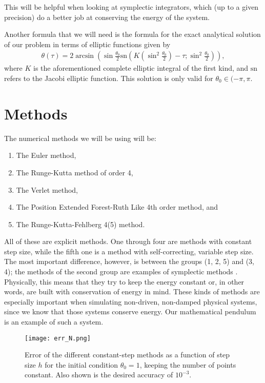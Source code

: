 \documentclass[10pt,a4paper,twocolumn]{article}
\begin{document}
This will be helpful when looking at symplectic integrators, which (up to a given precision) do a better job at conserving the energy of the system.

Another formula that we will need is the formula for the exact analytical solution of our problem in terms of elliptic functions given by \cite{anal_sol}
%
\begin{align}\label{eq:exact}
    \theta (\tau) = 2 \arcsin \! \! \left( \! \sin \frac{\theta_0}{2} \mathrm{sn} \! \! \left( \! K \! \! \left( \! \sin^2 \frac{\theta_0}{2} \! \right) \! \! - \! \tau; \sin^2 \frac{\theta_0}{2} \! \! \right) \! \right),
\end{align}
%
where $K$ is the aforementioned complete elliptic integral of the first kind, and $\mathrm{sn}$ refers to the Jacobi elliptic function. This solution is only valid for $\theta_0 \in (-\pi, \pi$.

\section{Methods}

The numerical methods we will be using will be:
%
\begin{enumerate}
    \item The Euler method,
    \item The Runge-Kutta method of order 4,
    \item The Verlet method,
    \item The Position Extended Forest-Ruth Like 4th order method, and
    \item The Runge-Kutta-Fehlberg 4(5) method.
\end{enumerate}

All of these are explicit methods. One through four are methods with constant step size, while the fifth one is a method with self-correcting, variable step size. The most important difference, however, is between the groups (1, 2, 5) and (3, 4); the methods of the second group are examples of symplectic methods \cite{symp}. Physically, this means that they try to keep the energy constant or, in other words, are built with conservation of energy in mind. These kinds of methods are especially important when simulating non-driven, non-damped physical systems, since we know that those systems conserve energy. Our mathematical pendulum is an example of such a system.


\begin{figure}
    \centering
    \captionsetup{justification=centering}
    \texttt{[image: err\_N.png]}
    \caption{Error of the different constant-step methods as a function of step size $h$ for the initial condition $\theta_0 = 1$, keeping the number of points constant. Also shown is the desired accuracy of $10^{-3}$.}
    \label{fig:err_N}
\end{figure}
\end{document}
